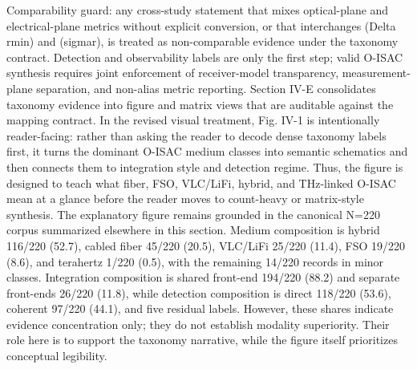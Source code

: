 {}Comparability guard: any cross-study statement that mixes optical-plane and electrical-plane metrics without explicit conversion, or that interchanges (\markdownRendererBackslash{}Delta r\markdownRendererUnderscore{}\markdownRendererLeftBrace{}\markdownRendererBackslash{}min\markdownRendererRightBrace{}) and (\markdownRendererBackslash{}sigma\markdownRendererUnderscore{}r), is treated as non-comparable evidence under the taxonomy contract.\markdownRendererParagraphSeparator
{} Detection and observability labels are only the first step; valid O-ISAC synthesis requires joint enforcement of receiver-model transparency, measurement-plane separation, and non-alias metric reporting.\markdownRendererInterblockSeparator
{}\markdownRendererThematicBreak{}\markdownRendererInterblockSeparator
{}
\markdownRendererSectionEnd 
\markdownRendererSectionEnd \markdownRendererSectionBegin
{}\markdownRendererInterblockSeparator
{}\markdownRendererSectionBegin
{}\markdownRendererInterblockSeparator
{}Section IV-E consolidates taxonomy evidence into figure and matrix views that are auditable against the mapping contract. In the revised visual treatment, Fig. IV-1 is intentionally reader-facing: rather than asking the reader to decode dense taxonomy labels first, it turns the dominant O-ISAC medium classes into semantic schematics and then connects them to integration style and detection regime. Thus, the figure is designed to teach what fiber, FSO, VLC/LiFi, hybrid, and THz-linked O-ISAC mean at a glance before the reader moves to count-heavy or matrix-style synthesis.\markdownRendererParagraphSeparator
{}The explanatory figure remains grounded in the canonical N=220 corpus summarized elsewhere in this section. Medium composition is hybrid 116/220 (52.7\markdownRendererPercentSign{}), cabled fiber 45/220 (20.5\markdownRendererPercentSign{}), VLC/LiFi 25/220 (11.4\markdownRendererPercentSign{}), FSO 19/220 (8.6\markdownRendererPercentSign{}), and terahertz 1/220 (0.5\markdownRendererPercentSign{}), with the remaining 14/220 records in minor classes. Integration composition is shared front-end 194/220 (88.2\markdownRendererPercentSign{}) and separate front-ends 26/220 (11.8\markdownRendererPercentSign{}), while detection composition is direct 118/220 (53.6\markdownRendererPercentSign{}), coherent 97/220 (44.1\markdownRendererPercentSign{}), and five residual labels. However, these shares indicate evidence concentration only; they do not establish modality superiority. Their role here is to support the taxonomy narrative, while the figure itself prioritizes conceptual legibility.\markdownRendererParagraphSeparator
